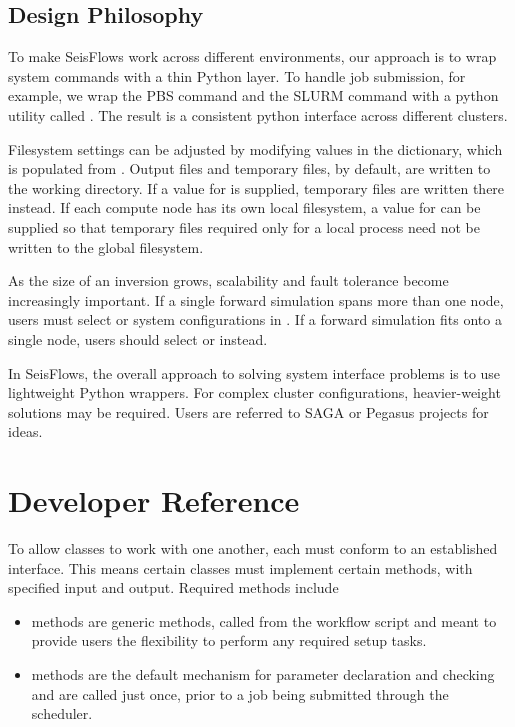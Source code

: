 \documentclass[letterpaper,10pt,english]{sphinxmanual}
\begin{document}
\subsection{Design Philosophy}
\label{\detokenize{main/usage:id1}}
To make SeisFlows work across different environments, our approach is to wrap system commands with a thin Python layer.  To handle job submission, for example, we wrap the PBS command  and the SLURM command  with a  python utility called .  The result is a consistent python interface across different clusters.

Filesystem settings can be adjusted by modifying values in the  dictionary, which is populated from .  Output files and temporary files, by default, are written to the working directory.  If a value for  is supplied, temporary files are written there instead.  If each compute node has its own local filesystem, a value for  can be supplied so that temporary files required only for a local process need not be written to the global filesystem.

As the size of an inversion grows, scalability and fault tolerance become increasingly important.  If a single forward simulation spans more than one node, users must select  or  system configurations in .  If a forward simulation fits onto a single node, users should select  or  instead.

In SeisFlows, the overall approach to solving system interface problems is to use lightweight Python wrappers.  For complex cluster configurations, heavier-weight solutions may be required.  Users are referred to SAGA or Pegasus projects for ideas.


\section{Developer Reference}
\label{\detokenize{main/usage:developer-reference}}\label{\detokenize{main/usage:developer}}
To allow classes to work with one another, each must conform to an established interface.  This means certain classes must implement certain methods, with specified input and output.  Required methods include
\begin{itemize}
\item {} 
 methods are generic methods, called from the  workflow script and meant to provide users the flexibility to perform any required setup tasks.

\item {} 
 methods are the default mechanism for parameter declaration and checking and are called just once, prior to a job being submitted through the scheduler.

\end{itemize}
\end{document}
